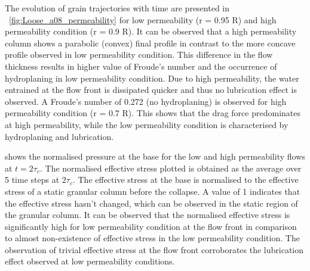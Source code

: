 The evolution of grain trajectories with time are presented in
~\cref{fig:Loose_a08_permeability} for low permeability (r = 0.95 R) and high 
permeability condition (r = 0.9 R). It can be observed that a high permeability 
column shows a parabolic (convex) final profile in contrast to the more concave 
profile observed in low permeability condition. This difference in the flow 
thickness results in higher value of Froude's number and the occurrence of 
hydroplaning in low permeability condition. Due to high permeability, the water 
entrained at the flow front is dissipated quicker and thus no lubrication 
effect is observed. A Froude's number of 0.272 (no hydroplaning) is observed 
for high permeability condition (r = 0.7 R). This shows that the drag force 
predominates at high permeability, while the low permeability condition is 
characterised by hydroplaning and lubrication.

 shows the normalised pressure at the 
base for the low and high permeability flows at $ t = 2\tau_c$. The normalised 
effective stress plotted is obtained as the average over 5 time steps at 
$2\tau_c$. The effective stress at the base is normalised to the effective 
stress of a static granular column before the collapse. A value of 1 indicates 
that 
the effective stress hasn't changed, which can be observed in the static region 
of 
the granular column. It can be observed that the normalised effective stress is 
significantly high for low permeability condition at the flow front in 
comparison to almost non-existence of effective stress in the low permeability 
condition. The observation of trivial effective stress at the flow front 
corroborates the lubrication effect observed at low permeability conditions.

